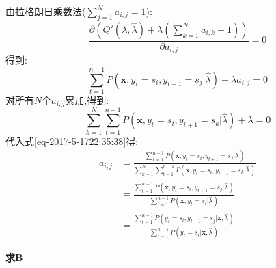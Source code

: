 \documentclass[UTF8,a4paper]{ctexart}%
\begin{document}
            由拉格朗日乘数法($\sum_{j = 1}^N a_{i,j} = 1$):
            \begin{equation}
              \frac{\partial\left( Q'(\lambda,\hat{\lambda}) + \lambda\left( \sum_{k = 1}^N a_{i,k} - 1 \right) \right)}{\partial a_{i,j}} = 0
            \end{equation}
            得到:
            \begin{equation}
              \sum_{t = 1}^{n-1}
                  P(\bm{x},y_t = s_i , y_{t+1} = s_j|\hat{\lambda})  + \lambda a_{i,j} = 0
              \label{eq-2017-5-1722:35:38}
            \end{equation}
            对所有$N$个$a_{i,j}$累加,得到:
            \begin{equation}
              \sum_{k = 1}^N \sum_{t = 1}^{n-1}
                  P(\bm{x},y_t = s_i , y_{t+1} = s_k|\hat{\lambda})  + \lambda = 0
            \end{equation}
            代入式\eqref{eq-2017-5-1722:35:38}得:
            \begin{equation}
              \begin{split}
              a_{i,j} &= \frac{ \sum_{t = 1}^{n-1}
                  P(\bm{x},y_t = s_i , y_{t+1} = s_j|\hat{\lambda}) }{\sum_{k = 1}^N \sum_{t = 1}^{n-1}
                  P(\bm{x},y_t = s_i , y_{t+1} = s_k|\hat{\lambda})}\\
                  &= \frac{ \sum_{t = 1}^{n-1}
                      P(\bm{x},y_t = s_i , y_{t+1} = s_j|\hat{\lambda}) }{ \sum_{t = 1}^{n-1}
                      P(\bm{x},y_t = s_i|\hat{\lambda})}\\
                  &= \frac{ \sum_{t = 1}^{n-1}
                      P(y_t = s_i , y_{t+1} = s_j|\bm{x},\hat{\lambda}) }{ \sum_{t = 1}^{n-1}
                      P(y_t = s_i|\bm{x},\hat{\lambda})}
                \end{split}
            \end{equation}

            \textbf{求$\bm{B}$}
\end{document}
